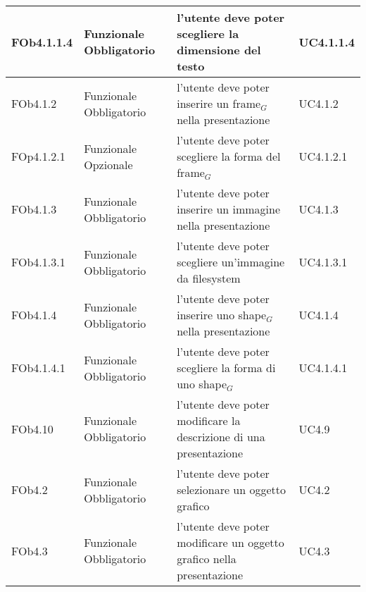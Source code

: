 \begin{longtable}{|l|p{2.5cm}|p{5cm}|p{3.5cm}|}
\hline
FOb4.1.1.4 & Funzionale \linebreak Obbligatorio & l'utente deve poter scegliere la dimensione del testo & UC4.1.1.4 \linebreak  \\
\hline
FOb4.1.2 & Funzionale \linebreak Obbligatorio & l'utente deve poter inserire un frame$_G$ nella presentazione & UC4.1.2 \linebreak  \\
\hline
FOp4.1.2.1 & Funzionale \linebreak Opzionale & l'utente deve poter scegliere la forma del frame$_G$ & UC4.1.2.1 \linebreak  \\
\hline
FOb4.1.3 & Funzionale \linebreak Obbligatorio & l'utente deve poter inserire un immagine nella presentazione & UC4.1.3 \linebreak  \\
\hline
FOb4.1.3.1 & Funzionale \linebreak Obbligatorio & l'utente deve poter scegliere un'immagine da filesystem & UC4.1.3.1 \linebreak  \\
\hline
FOb4.1.4 & Funzionale \linebreak Obbligatorio & l'utente deve poter inserire uno shape$_G$ nella presentazione & UC4.1.4 \linebreak  \\
\hline
FOb4.1.4.1 & Funzionale \linebreak Obbligatorio & l'utente deve poter scegliere la forma di uno shape$_G$ & UC4.1.4.1 \linebreak  \\
\hline
FOb4.10 & Funzionale \linebreak Obbligatorio & l'utente deve poter modificare la descrizione di una presentazione & UC4.9 \linebreak  \\
\hline
FOb4.2 & Funzionale \linebreak Obbligatorio & l'utente deve poter selezionare un oggetto grafico & UC4.2 \linebreak  \\
\hline
FOb4.3 & Funzionale \linebreak Obbligatorio & l'utente deve poter modificare un oggetto grafico nella presentazione & UC4.3 \linebreak  \\
\hline

\end{longtable}

